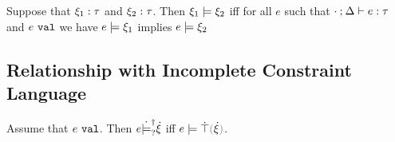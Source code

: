 \begin{definition}
  \label{defn:complete-constraint-entailment}
  Suppose that $\xi_1 : \tau$ and $\xi_2 : \tau$.
  Then $\xi_1 \models \xi_2$ iff for all $e$ such that $\cdot \mathbin{;} \Delta \vdash e : \tau$ and $e ~\mathtt{val}$ we have $e \models \xi_1$ implies $e \models \xi_2$
\end{definition}

\subsection{Relationship with Incomplete Constraint Language}

\begin{lemma}
  \label{lem:val-satisfy-truify}
  Assume that $e ~\mathtt{val}$. Then $e \dot{\models}_{?}^{\dag} \dot{\xi}$ iff $\ccsatisfy{e}{\ctruify{\hxi}}$.
\end{lemma}
